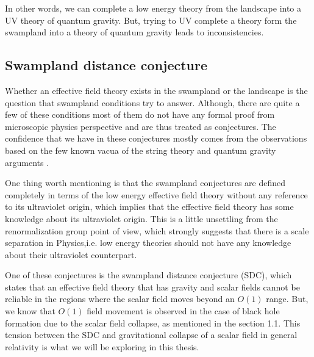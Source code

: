 
In other words, we can complete a low energy theory from the landscape into a UV theory of quantum gravity. But, trying to UV complete a theory form the swampland into a theory of quantum gravity leads to inconsistencies.

\subsection{Swampland distance conjecture}
Whether an effective field theory exists in the swampland or the landscape is the question that swampland conditions try to answer. Although, there are quite a few of these conditions most of them do not have any formal proof from microscopic physics perspective and are thus treated as conjectures. The confidence that we have in these conjectures mostly comes from the observations based on the few known vacua of the string theory and quantum gravity arguments \citep{Palti:2019pca} \citep{Brennan:2017rbf}.


One thing worth mentioning is that the swampland conjectures are defined completely in terms of the low energy effective field theory without any reference to its ultraviolet origin, which implies that the effective field theory has some knowledge about its ultraviolet origin. This is a little unsettling from the renormalization group point of view, which strongly suggests that there is a scale separation in Physics,i.e. low energy theories should not have any knowledge about their ultraviolet counterpart.

One of these conjectures is the swampland distance conjecture (SDC), which states that an effective field theory that has gravity and scalar fields cannot be reliable in the regions where the scalar field moves beyond an $O(1)$ range.
But, we know that $O(1)$ field movement is observed in the case of black hole formation due to the scalar field collapse, as mentioned in the section 1.1. This tension between the SDC and gravitational collapse of a scalar field in general
relativity is what we will be exploring in this thesis.